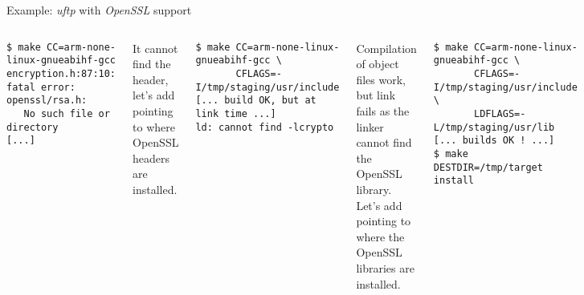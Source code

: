 \begin{frame}[fragile]{Example: {\em uftp} with {\em OpenSSL} support}
  \begin{columns}
  \begin{block}{}
    {\tiny
\begin{verbatim}
$ make CC=arm-none-linux-gnueabihf-gcc
encryption.h:87:10: fatal error: openssl/rsa.h:
   No such file or directory
[...]
\end{verbatim}
    }
  \end{block}

  {\small It cannot find the header, let's add  pointing
    to where OpenSSL headers are installed.}

  \begin{block}{}
    {\tiny
\begin{verbatim}
$ make CC=arm-none-linux-gnueabihf-gcc \
       CFLAGS=-I/tmp/staging/usr/include
[... build OK, but at link time ...]
ld: cannot find -lcrypto
\end{verbatim}
    }
  \end{block}

  {\small Compilation of object files work, but link fails as the
    linker cannot find the OpenSSL library. Let's add 
    pointing to where the OpenSSL libraries are installed.}


  \begin{block}{}
    {\tiny
\begin{verbatim}
$ make CC=arm-none-linux-gnueabihf-gcc \
       CFLAGS=-I/tmp/staging/usr/include \
       LDFLAGS=-L/tmp/staging/usr/lib
[... builds OK ! ...]
$ make DESTDIR=/tmp/target install
\end{verbatim}
    }
  \end{block}

  {\small Now it builds and installs fine!}

  \begin{block}{}
    {\tiny
\begin{verbatim}
$ arm-none-linux-gnueabihf-readelf -d /tmp/target/usr/bin/uftp
[...]
 0x00000001 (NEEDED) Shared library: [libm.so.6]
 0x00000001 (NEEDED) Shared library: [libcrypto.so.1.1]
 0x00000001 (NEEDED) Shared library: [libpthread.so.0]
 0x00000001 (NEEDED) Shared library: [libc.so.6]
[...]
\end{verbatim}
    }
  \end{block}

  {\small We can indeed see that  is linked against the
     shared library.}

\end{columns}
\end{frame}

